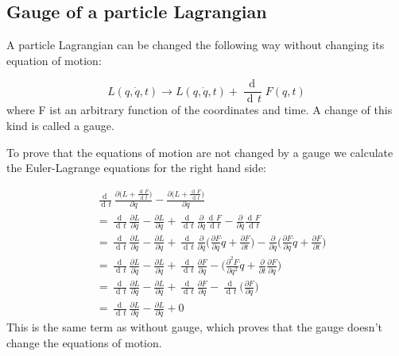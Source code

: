 \documentclass{article}
\DeclareMathOperator{\dd}{d\!}
\begin{document}
\subsection{Gauge of a particle Lagrangian}
A particle Lagrangian can be changed the following way without changing its equation of motion:

\begin{equation}
    L(q,\dot{q}, t) \rightarrow L(q,\dot{q}, t) + \frac{\dd}{ \dd t} F(q,t)
\end{equation}
where F ist an arbitrary function of the coordinates and time.
A change of this kind is called a gauge.

To prove that the equations of motion are not changed by a gauge we calculate the Euler-Lagrange equations for the right hand side:

\begin{align}
    & \frac{\dd}{\dd t} \frac{\partial \big(L + \frac{\dd F}{\dd t}\big)}{\partial \dot{q}} - \frac{\partial \big(L + \frac{\dd F}{\dd t}\big)}{\partial q} \nonumber \\
    & = \frac{\dd}{\dd t} \frac{\partial L}{\partial \dot{q}} - \frac{\partial L }{\partial q}
        + \frac{\dd}{\dd t} \frac{\partial}{\partial \dot{q}} \frac{\dd F}{\dd t}  - \frac{\partial}{\partial q} \frac{\dd F}{\dd t} \nonumber \\
    & = \frac{\dd}{\dd t} \frac{\partial L}{\partial \dot{q}} - \frac{\partial L }{\partial q}
        + \frac{\dd}{\dd t} \frac{\partial}{\partial \dot{q}} \bigg( \frac{\partial F}{\partial q} \dot{q} + \frac{\partial F}{\partial t} \bigg)
        - \frac{\partial}{\partial q} \bigg( \frac{\partial F}{\partial q} \dot{q} + \frac{\partial F}{\partial t} \bigg) \nonumber \\
    & = \frac{\dd}{\dd t} \frac{\partial L}{\partial \dot{q}} - \frac{\partial L }{\partial q}
        + \frac{\dd}{\dd t} \frac{\partial F}{\partial q}
        - \bigg(\frac{\partial^2 F}{\partial q^2} \dot{q} + \frac{\partial }{\partial t} \frac{\partial F}{\partial q} \bigg) \nonumber \\
    & = \frac{\dd}{\dd t} \frac{\partial L}{\partial \dot{q}} - \frac{\partial L }{\partial q}
        + \frac{\dd}{\dd t} \frac{\partial F}{\partial q}
        - \frac{\dd}{\dd t} \bigg(\frac{\partial F}{\partial q} \bigg) \nonumber \\
    & = \frac{\dd}{\dd t} \frac{\partial L}{\partial \dot{q}} - \frac{\partial L }{\partial q} + 0
\end{align}
This is the same term as without gauge, which proves that the gauge doesn't change the equations of motion.
\end{document}
